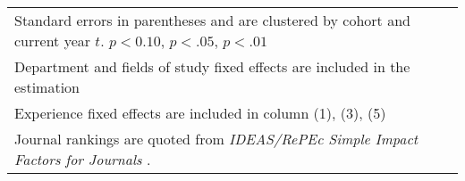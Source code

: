 \begin{table}[ht]
{\begin{tabular}{l*{6}{c}}
\hline\hline
\multicolumn{7}{l}{\footnotesize Standard errors in parentheses and are clustered by cohort and current year $t$. \sym{*} \(p<0.10\), \sym{**} \(p<.05\), \sym{***} \(p<.01\)}\\
\multicolumn{7}{l}{\footnotesize Department and fields of study fixed effects are included in the estimation }\\
\multicolumn{7}{l}{\footnotesize Experience fixed effects are included in column (1), (3), (5) }\\
\multicolumn{7}{l}{\footnotesize Journal rankings are quoted from \textit{IDEAS/RePEc Simple Impact Factors for Journals }.}\\
\end{tabular}%
}
\end{table}
